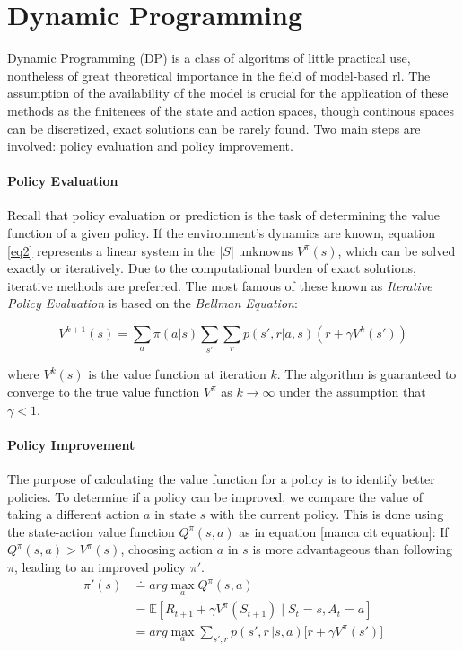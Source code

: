 \documentclass[a4paper,11pt]{report}
\theoremstyle{definition}
\theoremstyle{plain}
\theoremstyle{remark}  %
\begin{document}
\section{Dynamic Programming}
Dynamic Programming (DP) is a class of algoritms of little practical use, nontheless of great theoretical 
importance in the field of model-based \gls{rl}. The assumption of the availability of the model is 
crucial for the application of these methods as the finitenees of the state and action spaces, though 
continous spaces can be discretized, exact solutions can be rarely found. 
Two main steps are involved: policy evaluation and policy improvement.

\paragraph{Policy Evaluation} Recall that policy evaluation or prediction is the task of determining 
the value function of a given policy. If the environment's dynamics are known, equation \ref{eq2} represents 
a linear system in the $|S|$ unknowns $V^{\pi}(s)$, which can be solved exactly or iteratively. Due 
to the computational burden of exact solutions, iterative methods are preferred. The most famous of these 
known as \textit{Iterative Policy Evaluation} is based on the \textit{Bellman Equation}:

$$V^{k+1}(s) = \sum_{a}\pi(a|s)\sum_{s'}\sum_{r}p(s',r|a, s)(r+\gamma V^{k}(s'))$$

where $V^{k}(s)$ is the value function at iteration $k$. The algorithm is guaranteed to converge to the 
true value function $V^{\pi}$ as $k \rightarrow \infty$ under the assumption that $\gamma < 1$.

\paragraph{Policy Improvement} 
The purpose of calculating the value function for a policy is to identify better policies. 
To determine if a policy can be improved, we 
compare the value of taking a different action \( a \) in state \( s \) with the current policy. 
This is done using the state-action value function \( Q^\pi(s, a) \) as in equation [manca cit equation]:
If $Q^\pi(s, a) > V^\pi(s)$, choosing action $a$ in $s$ is more advantageous than following $\pi$, 
leading to an improved policy $\pi'$. 
\begin{align}
    \pi'(s) & \doteq arg\max_a Q^\pi(s,a) \nonumber\\
    &=  \mathbb{E}[R_{t+1}+\gamma V^{\pi}(S_{t+1})\mid S_t=s,A_t=a] \nonumber\\
    &= arg\max _a \sum_{s', r} p(s',r\,|s,a)\Big[r+\gamma V^{\pi}(s')\Big] \nonumber\\
\end{align}
\end{document}
